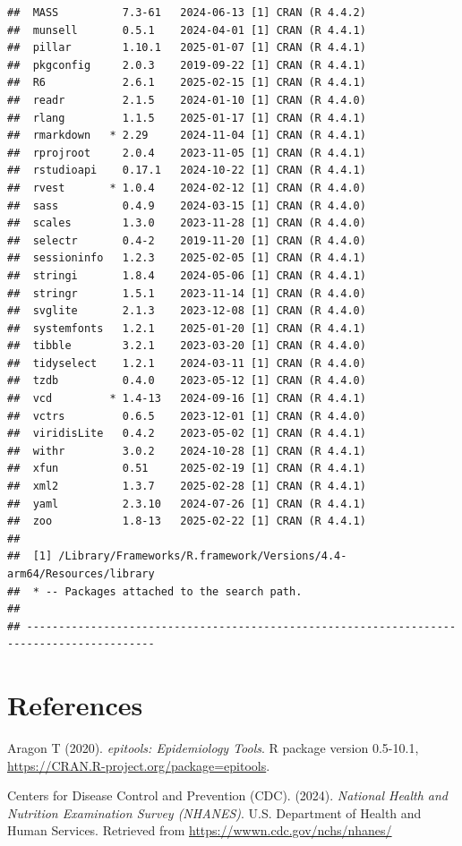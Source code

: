 \documentclass[
]{article}
\begin{document}
\begin{verbatim}
##  MASS          7.3-61   2024-06-13 [1] CRAN (R 4.4.2)
##  munsell       0.5.1    2024-04-01 [1] CRAN (R 4.4.1)
##  pillar        1.10.1   2025-01-07 [1] CRAN (R 4.4.1)
##  pkgconfig     2.0.3    2019-09-22 [1] CRAN (R 4.4.1)
##  R6            2.6.1    2025-02-15 [1] CRAN (R 4.4.1)
##  readr         2.1.5    2024-01-10 [1] CRAN (R 4.4.0)
##  rlang         1.1.5    2025-01-17 [1] CRAN (R 4.4.1)
##  rmarkdown   * 2.29     2024-11-04 [1] CRAN (R 4.4.1)
##  rprojroot     2.0.4    2023-11-05 [1] CRAN (R 4.4.1)
##  rstudioapi    0.17.1   2024-10-22 [1] CRAN (R 4.4.1)
##  rvest       * 1.0.4    2024-02-12 [1] CRAN (R 4.4.0)
##  sass          0.4.9    2024-03-15 [1] CRAN (R 4.4.0)
##  scales        1.3.0    2023-11-28 [1] CRAN (R 4.4.0)
##  selectr       0.4-2    2019-11-20 [1] CRAN (R 4.4.0)
##  sessioninfo   1.2.3    2025-02-05 [1] CRAN (R 4.4.1)
##  stringi       1.8.4    2024-05-06 [1] CRAN (R 4.4.1)
##  stringr       1.5.1    2023-11-14 [1] CRAN (R 4.4.0)
##  svglite       2.1.3    2023-12-08 [1] CRAN (R 4.4.0)
##  systemfonts   1.2.1    2025-01-20 [1] CRAN (R 4.4.1)
##  tibble        3.2.1    2023-03-20 [1] CRAN (R 4.4.0)
##  tidyselect    1.2.1    2024-03-11 [1] CRAN (R 4.4.0)
##  tzdb          0.4.0    2023-05-12 [1] CRAN (R 4.4.0)
##  vcd         * 1.4-13   2024-09-16 [1] CRAN (R 4.4.1)
##  vctrs         0.6.5    2023-12-01 [1] CRAN (R 4.4.0)
##  viridisLite   0.4.2    2023-05-02 [1] CRAN (R 4.4.1)
##  withr         3.0.2    2024-10-28 [1] CRAN (R 4.4.1)
##  xfun          0.51     2025-02-19 [1] CRAN (R 4.4.1)
##  xml2          1.3.7    2025-02-28 [1] CRAN (R 4.4.1)
##  yaml          2.3.10   2024-07-26 [1] CRAN (R 4.4.1)
##  zoo           1.8-13   2025-02-22 [1] CRAN (R 4.4.1)
## 
##  [1] /Library/Frameworks/R.framework/Versions/4.4-arm64/Resources/library
##  * -- Packages attached to the search path.
## 
## ------------------------------------------------------------------------------------------
\end{verbatim}

\section{References}\label{references}

Aragon T (2020). \emph{epitools: Epidemiology Tools}. R package version
0.5-10.1, \url{https://CRAN.R-project.org/package=epitools}.

Centers for Disease Control and Prevention (CDC). (2024). \emph{National
Health and Nutrition Examination Survey (NHANES)}. U.S. Department of
Health and Human Services. Retrieved from
\url{https://wwwn.cdc.gov/nchs/nhanes/}
\end{document}
